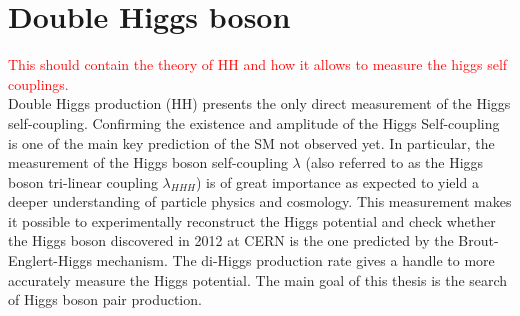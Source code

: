 \section{Double Higgs boson}
\label{chap1:HH}
\textcolor{red}{This should contain the theory of HH and how it allows to measure the higgs self couplings.
\\
}
Double Higgs production (HH) presents the only direct measurement of the Higgs self-coupling. Confirming the existence and amplitude of the Higgs Self-coupling is one of the main key prediction of the SM not observed yet. In particular, the measurement of the Higgs boson self-coupling $\lambda$ (also referred to as the Higgs boson tri-linear coupling $\lambda_{HHH}$) is of great importance as expected to yield a deeper understanding of particle physics and cosmology. This measurement makes it possible to experimentally reconstruct the Higgs potential and check whether the Higgs boson discovered in 2012 at CERN is the one predicted by the Brout-Englert-Higgs mechanism. The di-Higgs production rate gives a handle to more accurately measure the Higgs potential. The main goal of this thesis is the search of Higgs boson pair production.
